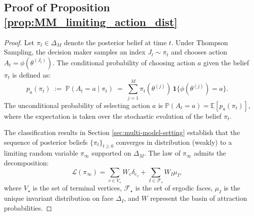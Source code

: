 \documentclass[12pt]{article}
\begin{document}
\subsection{Proof of Proposition \ref{prop:MM_limiting_action_dist}}
\begin{proof}
    Let $\pi_t \in \Delta_M$ denote the posterior belief at time $t$. Under Thompson Sampling, the decision maker samples an index $J_t \sim \pi_t$ and chooses action $A_t = \phi(\theta^{(J_t)})$. The conditional probability of choosing action $a$ given the belief $\pi_t$ is defined as:
    \begin{equation}
        p_a(\pi_t) \;:=\; \mathbb{P}(A_t = a \mid \pi_t) \;=\; \sum_{j=1}^M \pi_t(\theta^{(j)}) \, \mathbf{1}\{\phi(\theta^{(j)}) = a\}.
    \end{equation}
    The unconditional probability of selecting action $a$ is $\mathbb{P}(A_t = a) = \mathbb{E}[p_a(\pi_t)]$, where the expectation is taken over the stochastic evolution of the belief $\pi_t$.
    
    The classification results in Section \ref{sec:multi-model-setting} establish that the sequence of posterior beliefs $\{\pi_t\}_{t \ge 0}$ converges in distribution (weakly) to a limiting random variable $\pi_\infty$ supported on $\Delta_M$. The law of $\pi_\infty$ admits the decomposition:
    \begin{equation}
        \mathcal{L}(\pi_\infty) = \sum_{v \in V_\star} W_v \delta_{e_v} + \sum_{I \in \mathcal{F}_\star} W_I \mu_I,
    \end{equation}
    where $V_\star$ is the set of terminal vertices, $\mathcal{F}_\star$ is the set of ergodic faces, $\mu_I$ is the unique invariant distribution on face $\Delta_I$, and $W$ represent the basin of attraction probabilities.
    

\end{proof}
\end{document}
